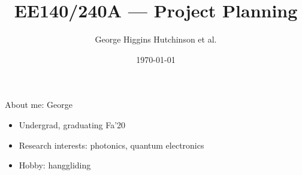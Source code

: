\documentclass{beamer}
\title{EE140/240A --- Project Planning}
\author{George Higgins Hutchinson et al. }
\date{\today}
\begin{document}
	\begin{frame}
		\titlepage
	\end{frame}

    \begin{frame}{About me: George}
        \begin{itemize}
            \item Undergrad, graduating Fa'20
            \item Research interests: photonics, quantum electronics
            \item Hobby: hanggliding
        \end{itemize}
    \end{frame}
\end{document}
